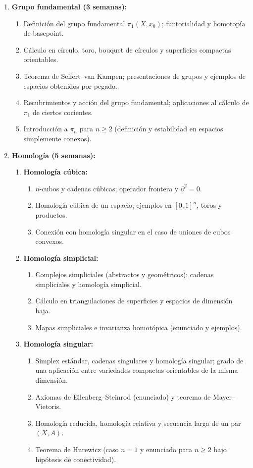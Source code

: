 \begin{refsection}
\begin{enumerate}
\item \textbf{Grupo fundamental (3 semanas):}
\begin{enumerate}
    \item Definición del grupo fundamental $\pi_1(X,x_0)$; funtorialidad y homotopía de basepoint.
    \item Cálculo en círculo, toro, bouquet de círculos y superficies compactas orientables.
    \item Teorema de Seifert--van Kampen; presentaciones de grupos y ejemplos de espacios obtenidos por pegado.
    \item Recubrimientos y acción del grupo fundamental; aplicaciones al cálculo de $\pi_1$ de ciertos cocientes.
    \item Introducción a $\pi_n$ para $n \ge 2$ (definición y estabilidad en espacios simplemente conexos).
\end{enumerate}

\item \textbf{Homología (5 semanas):}
\begin{enumerate}
    \item \textbf{Homología cúbica:}
    \begin{enumerate}
        \item $n$-cubos y cadenas cúbicas; operador frontera y $\partial^2 = 0$.
        \item Homología cúbica de un espacio; ejemplos en $[0,1]^n$, toros y productos.
        \item Conexión con homología singular en el caso de uniones de cubos convexos.
    \end{enumerate}
    \item \textbf{Homología simplicial:}
    \begin{enumerate}
        \item Complejos simpliciales (abstractos y geométricos); cadenas simpliciales y homología simplicial.
        \item Cálculo en triangulaciones de superficies y espacios de dimensión baja.
        \item Mapas simpliciales e invarianza homotópica (enunciado y ejemplos).
    \end{enumerate}
    \item \textbf{Homología singular:}
    \begin{enumerate}
        \item Simplex estándar, cadenas singulares y homología singular; grado de una aplicación entre variedades compactas orientables de la misma dimensión.
        \item Axiomas de Eilenberg--Steinrod (enunciado) y teorema de Mayer--Vietoris.
        \item Homología reducida, homología relativa y secuencia larga de un par $(X,A)$.
        \item Teorema de Hurewicz (caso $n=1$ y enunciado para $n \ge 2$ bajo hipótesis de conectividad).
    \end{enumerate}
\end{enumerate}


\end{enumerate}
\end{refsection}
